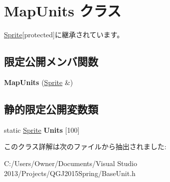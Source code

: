 \hypertarget{class_map_units}{}\section{Map\+Units クラス}
\label{class_map_units}


\hyperlink{class_sprite}{Sprite}{\ttfamily  \mbox{[}protected\mbox{]}}に継承されています。

\subsection*{限定公開メンバ関数}
\begin{DoxyCompactItemize}
\item 
{\bfseries Map\+Units} (\hyperlink{class_sprite}{Sprite} \&)\hypertarget{class_map_units_af60de7d638e0f47843ed16a6467ad334}{}\label{class_map_units_af60de7d638e0f47843ed16a6467ad334}

\end{DoxyCompactItemize}
\subsection*{静的限定公開変数類}
\begin{DoxyCompactItemize}
\item 
static \hyperlink{class_sprite}{Sprite} {\bfseries Units} \mbox{[}100\mbox{]}\hypertarget{class_map_units_afabeff6fc105ea22acc53eaf4353dbbf}{}\label{class_map_units_afabeff6fc105ea22acc53eaf4353dbbf}

\end{DoxyCompactItemize}


このクラス詳解は次のファイルから抽出されました\+:\begin{DoxyCompactItemize}
\item 
C\+:/\+Users/\+Owner/\+Documents/\+Visual Studio 2013/\+Projects/\+Q\+G\+J2015\+Spring/Base\+Unit.\+h\end{DoxyCompactItemize}
